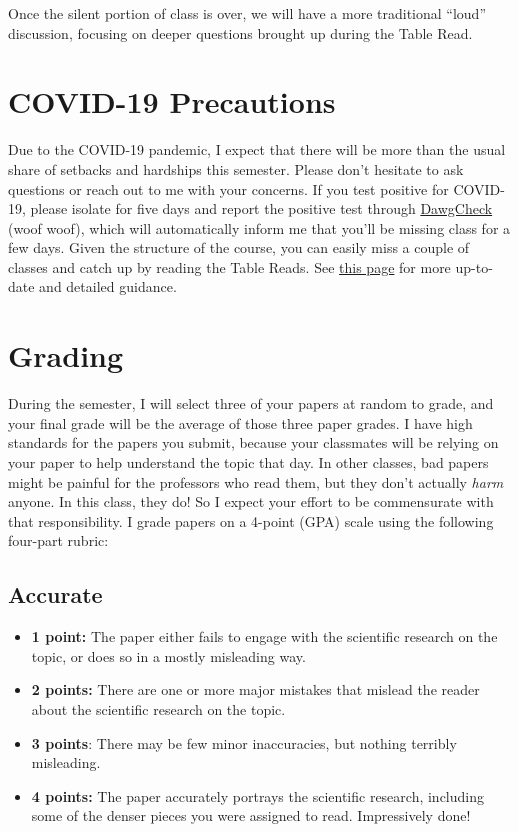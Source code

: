 \documentclass[11pt, letterpaper]{article}
\begin{document}
Once the silent portion of class is over, we will have a more traditional ``loud'' discussion, focusing on deeper questions brought up during the Table Read.

\section*{COVID-19 Precautions}

Due to the COVID-19 pandemic, I expect that there will be more than the usual share of setbacks and hardships this semester. Please don't hesitate to ask questions or reach out to me with your concerns. If you test positive for COVID-19, please isolate for five days and report the positive test through \href{https://dawgcheck.uga.edu/}{DawgCheck} (woof woof), which will automatically inform me that you'll be missing class for a few days. Given the structure of the course, you can easily miss a couple of classes and catch up by reading the Table Reads. See \href{https://ovpi.uga.edu/_resources/documents/Syllabi-Info-for-Students-Spring-2022.pdf}{this page} for more up-to-date and detailed guidance.

\section*{Grading}

During the semester, I will select three of your papers at random to grade, and your final grade will be the average of those three paper grades. I have high standards for the papers you submit, because your classmates will be relying on your paper to help understand the topic that day. In other classes, bad papers might be painful for the professors who read them, but they don't actually \textit{harm} anyone. In this class, they do! So I expect your effort to be commensurate with that responsibility. I grade papers on a 4-point (GPA) scale using the following four-part rubric:

\subsection*{Accurate}

\begin{itemize}
	\item \textbf{1 point:} The paper either fails to engage with the scientific research on the topic, or does so in a mostly misleading way.
	\item \textbf{2 points:} There are one or more major mistakes that mislead the reader about the scientific research on the topic.
	\item \textbf{3 points}: There may be few minor inaccuracies, but nothing terribly misleading.
	\item \textbf{4 points:} The paper accurately portrays the scientific research, including some of the denser pieces you were assigned to read. Impressively done!
\end{itemize}
\end{document}
